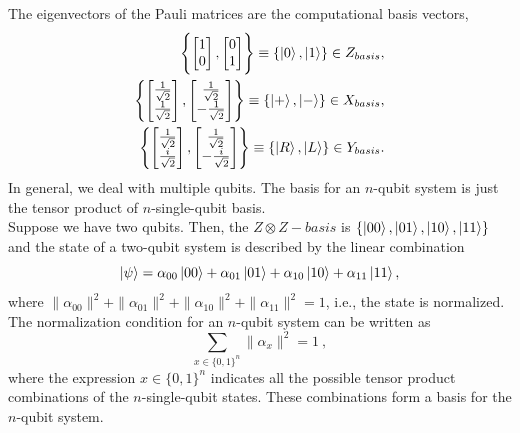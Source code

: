 The eigenvectors of the Pauli matrices are the computational basis vectors,
\begin{align*}
    \Biggl\{\begin{bmatrix}
           1 \\
           0 
         \end{bmatrix}, \begin{bmatrix}
           0 \\
           1 
         \end{bmatrix} \Biggr\}\equiv \{\ket{0}, \ket{1}\} \in Z_{basis}, \\
         \Biggl\{\begin{bmatrix}
           \frac{1}{\sqrt{2}} \\
           \frac{1}{\sqrt{2}} 
         \end{bmatrix}, \begin{bmatrix}
           \frac{1}{\sqrt{2}} \\
           -\frac{1}{\sqrt{2}} 
         \end{bmatrix} \Biggr\}\equiv \{\ket{+}, \ket{-}\} \in X_{basis}, \\
         \Biggl\{\begin{bmatrix}
           \frac{1}{\sqrt{2}} \\
           \frac{i}{\sqrt{2}} 
         \end{bmatrix}, \begin{bmatrix}
           \frac{1}{\sqrt{2}} \\
           -\frac{i}{\sqrt{2}} 
         \end{bmatrix} \Biggr\}\equiv \{\ket{R}, \ket{L}\} \in Y_{basis}.
\end{align*}
In general, we deal with multiple qubits. The basis for an $n$-qubit system is just the tensor product of $n$-single-qubit basis.\\
Suppose we have two qubits. Then, the $Z\otimes Z-basis$ is $\{\ket{00},\ket{01},\ket{10},\ket{11}\}$ and the state of a two-qubit system is described by the linear combination
\begin{equation}
    \ket{\psi} = \alpha_{00}\ket{00} +\alpha_{01}\ket{01} +\alpha_{10}\ket{10} +\alpha_{11}\ket{11},
\end{equation}
where $\|\alpha_{00}\|^{2} + \|\alpha_{01}\|^{2} + \|\alpha_{10}\|^{2} + \|\alpha_{11}\|^{2} = 1$, i.e., the state is normalized.\\
The normalization condition for an $n$-qubit system can be written as
\begin{equation}
\sum_{x\in \{0,1\}^{n}}\|\alpha_{x}\|^{2} = 1\ ,
\end{equation}
where the expression $x \in \{0,1\}^{n}$ indicates all the possible tensor product combinations of the $n$-single-qubit states. These combinations form a basis for the $n$-qubit system.

